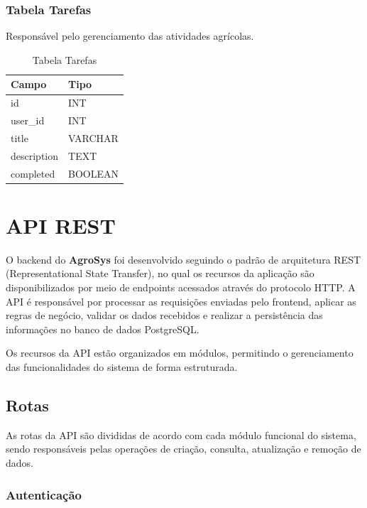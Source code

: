 \documentclass[12pt]{article}
\begin{document}
\subsubsection{Tabela Tarefas}

Responsável pelo gerenciamento das atividades agrícolas.

\begin{table}[H]
  \centering
  \caption{Tabela Tarefas}
  \begin{tabular}{|l|l|}
    \hline
    \textbf{Campo} & \textbf{Tipo} \\ \hline
    id             & INT           \\ \hline
    user\_id       & INT           \\ \hline
    title          & VARCHAR       \\ \hline
    description    & TEXT          \\ \hline
    completed      & BOOLEAN       \\ \hline
  \end{tabular}
\end{table}

\section{API REST}

O backend do \textbf{AgroSys} foi desenvolvido seguindo o padrão de arquitetura REST (Representational State Transfer), no qual os recursos da aplicação são disponibilizados por meio de endpoints acessados através do protocolo HTTP. A API é responsável por processar as requisições enviadas pelo frontend, aplicar as regras de negócio, validar os dados recebidos e realizar a persistência das informações no banco de dados PostgreSQL.

Os recursos da API estão organizados em módulos, permitindo o gerenciamento das funcionalidades do sistema de forma estruturada.

\subsection{Rotas}

As rotas da API são divididas de acordo com cada módulo funcional do sistema, sendo responsáveis pelas operações de criação, consulta, atualização e remoção de dados.

\subsubsection{Autenticação}
\end{document}
